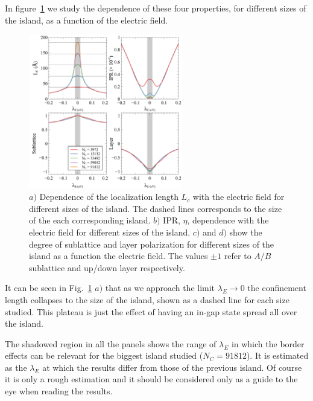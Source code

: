 In figure~\ref{IPR_lc} we study the dependence of these four properties, for different sizes of the island, as a function of the electric field.
\begin{figure}[!ht]
\centering
\includegraphics[width=0.6\textwidth]{chapter06/figures/single_vac_properties.pdf}
\vspace{-5pt}
\caption{$a)$ Dependence of the localization length $L_c$ with the electric field for different sizes of the island. The dashed lines corresponds to the size of the each corresponding island. $b)$ IPR, $\eta$, dependence with the electric field for different sizes of the island. $c)$ and $d)$ show the degree of sublattice and layer polarization for different sizes of the island as a function the electric field. The values $\pm1$ refer to $A/B$ sublattice and up/down layer respectively.}
\label{IPR_lc}
\end{figure}
\FloatBarrier

It can be seen in Fig.~\ref{IPR_lc} $a)$ that as we approach the limit $\lambda_E\rightarrow0$ the confinement length collapses to the size of the island, shown as a dashed line for each size studied. This plateau is just the effect of having an in-gap state spread all over the island.

The shadowed region in all the panels shows the range of $\lambda_E$ in which the border effects can be relevant for the biggest island studied ($N_C=91812$). It is estimated as the $\lambda_E$ at which the results differ from those of the previous island. Of course it is only a rough estimation and it should be considered only as a guide to the eye when reading the results.

